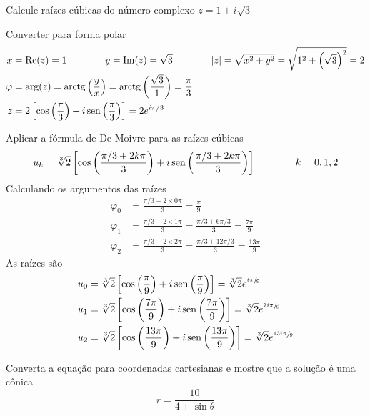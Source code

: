 \documentclass[a4paper,12pt,fleqn]{article}
\begin{document}

\setlength{\jot}{6pt}

Calcule raízes cúbicas do número complexo \( z = 1 + i\sqrt{3} \)
\clearpagequestiononly

\begin{answer}
  Converter para forma polar
  \begin{align*}
    x       & = \operatorname{Re}(z) = 1        \qquad\qquad
    y         = \operatorname{Im}(z) = \sqrt{3} \qquad\qquad
    |z|       = \sqrt{x^2+y^2}
              = \sqrt{1^2 + \left(\sqrt{3}\right)^2}
              = 2         \\
    \varphi & = \arg(z)
              = \operatorname{arctg}\left(\frac{y}{x}\right)
              = \operatorname{arctg}\left(\frac{\sqrt{3}}{1}\right)
              = \frac{\pi}{3} \\
    z       & = 2 \left[\cos\left(\frac{\pi}{3}\right) + i \operatorname{sen}\left(\frac{\pi}{3}\right)\right]
              = 2e^{i\pi/3}
  \end{align*}

  Aplicar a fórmula de De Moivre para as raízes cúbicas
  \[
    u_k = \sqrt[3]{2}\left[\cos\left(\frac{\pi/3 + 2k\pi}{3}\right) + i \operatorname{sen}\left(\frac{\pi/3 + 2k\pi}{3}\right)\right]
    \qquad\qquad k = 0,1,2
  \]
  Calculando os argumentos das raízes
  \begin{align*}
    \varphi_0
    & = \frac{\pi/3 + 2\times 0\pi}{3}
      = \frac{\pi}{9} \\
    \varphi_1
    & = \frac{\pi/3 + 2\times 1\pi}{3}
      = \frac{\pi/3 + 6\pi/3}{3}
      = \frac{7\pi}{9} \\
    \varphi_2
    & = \frac{\pi/3 + 2\times 2\pi}{3}
      = \frac{\pi/3 + 12\pi/3}{3}
      = \frac{13\pi}{9}
  \end{align*}
  As raízes são
  \begin{align*}
    u_0 & = \sqrt[3]{2} \left[\cos\left(\frac{\pi}{9}\right) + i \operatorname{sen}\left(\frac{\pi}{9}\right)\right]   = \sqrt[3]{2} e^{\sfrac{  i\pi}{9}}\\
    u_1 & = \sqrt[3]{2} \left[\cos\left(\frac{7\pi}{9}\right) + i \operatorname{sen}\left(\frac{7\pi}{9}\right)\right]  = \sqrt[3]{2} e^{\sfrac{7 i\pi}{9}}\\
    u_2 & = \sqrt[3]{2} \left[\cos\left(\frac{13\pi}{9}\right) + i \operatorname{sen}\left(\frac{13\pi}{9}\right)\right] = \sqrt[3]{2} e^{\sfrac{13i\pi}{9}}
  \end{align*}
\end{answer}

Converta a equação para coordenadas cartesianas e mostre que a solução é uma cônica
\[
  r = \frac{10}{4 + \sin\theta}
\]
\clearpagequestiononly
\end{document}
